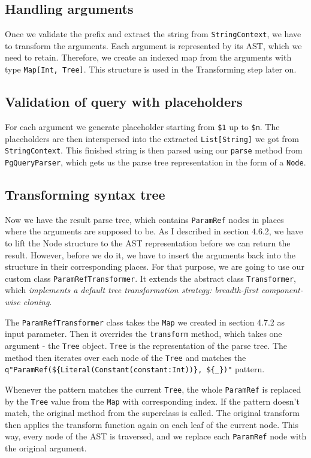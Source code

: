 \subsection{Handling arguments}
Once we validate the prefix and extract the string from \texttt{StringContext}, we have to transform the arguments. Each argument is represented by its AST, which we need to retain. Therefore, we create an indexed map from the arguments with type \texttt{Map[Int, Tree]}. This structure is used in the Transforming step later on.

\subsection{Validation of query with placeholders}
For each argument we generate placeholder starting from \texttt{\$1} up to \texttt{\$n}. The placeholders are then interspersed into the extracted \texttt{List[String]} we got from \texttt{StringContext}. This finished string is then parsed using our \texttt{parse} method from \texttt{PgQueryParser}, which gets us the parse tree representation in the form of a \texttt{Node}.

\subsection{Transforming syntax tree}
Now we have the result parse tree, which contains \texttt{ParamRef} nodes in places where the arguments are supposed to be. As I described in section 4.6.2, we have to lift the Node structure to the AST representation before we can return the result. However, before we do it, we have to insert the arguments back into the structure in their corresponding places. For that purpose, we are going to use our custom class \texttt{ParamRefTransformer}. It extends the abstract class \texttt{Transformer}, which \textit{implements a default tree transformation strategy: breadth-first component-wise cloning}.\cite{Transformer} 

The \texttt{ParamRefTransformer} class takes the \texttt{Map} we created in section 4.7.2 as input parameter. Then it overrides the \texttt{transform} method, which takes one argument - the \texttt{Tree} object. \texttt{Tree} is the representation of the parse tree. The method then iterates over each node of the \texttt{Tree} and matches the \texttt{q"ParamRef(\$\{Literal(Constant(constant:Int))\}, \$\{\_\})"} pattern.

Whenever the pattern matches the current \texttt{Tree}, the whole \texttt{ParamRef} is replaced by the \texttt{Tree} value from the \texttt{Map} with corresponding index. If the pattern doesn't match, the original method from the superclass is called. The original transform then applies the transform function again on each leaf of the current node.
This way, every node of the AST is traversed, and we replace each \texttt{ParamRef} node with the original argument.

